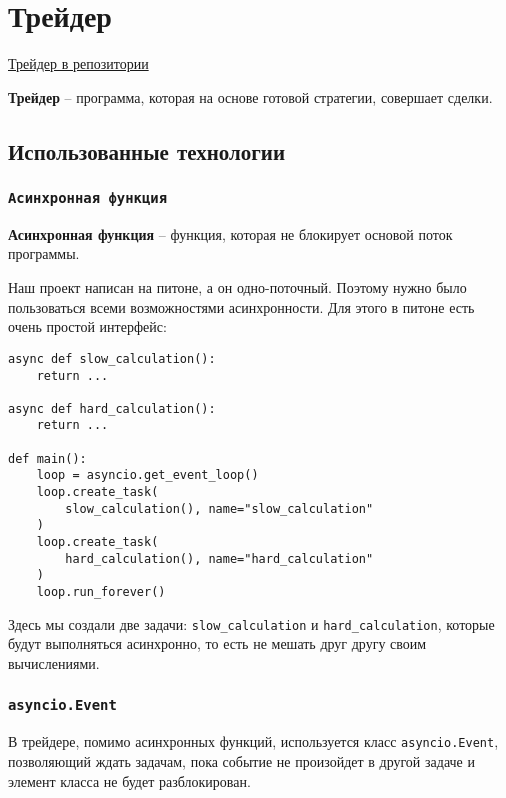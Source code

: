 \section{Трейдер}

\href{https://github.com/dexety/dex-trading-system/blob/main/strategy/arbitrage/trader.py}{Трейдер в репозитории}

\begin{definition}
\textbf{Трейдер} -- программа, которая на основе готовой стратегии, совершает сделки.
\end{definition}

\subsection{Использованные технологии}

\subsubsection{\texttt{Асинхронная функция}}

\begin{definition}
\textbf{Асинхронная функция} -- функция, которая не блокирует основой поток программы.
\end{definition}

Наш проект написан на питоне, а он одно-поточный. Поэтому нужно было пользоваться всеми возможностями асинхронности. Для этого в питоне есть очень простой интерфейс:

\begin{verbatim}
async def slow_calculation():
    return ...
    
async def hard_calculation():
    return ...
    
def main():
    loop = asyncio.get_event_loop()
    loop.create_task(
        slow_calculation(), name="slow_calculation"
    )
    loop.create_task(
        hard_calculation(), name="hard_calculation"
    )
    loop.run_forever()
\end{verbatim}

Здесь мы создали две задачи: \texttt{slow\_calculation} и  \texttt{hard\_calculation}, которые будут выполняться асинхронно, то есть не мешать друг другу своим вычислениями.

\subsubsection{\texttt{asyncio.Event}}

В трейдере, помимо асинхронных функций, используется класс \texttt{asyncio.Event}, позволяющий ждать задачам, пока событие не произойдет в другой задаче и элемент класса не будет разблокирован.

